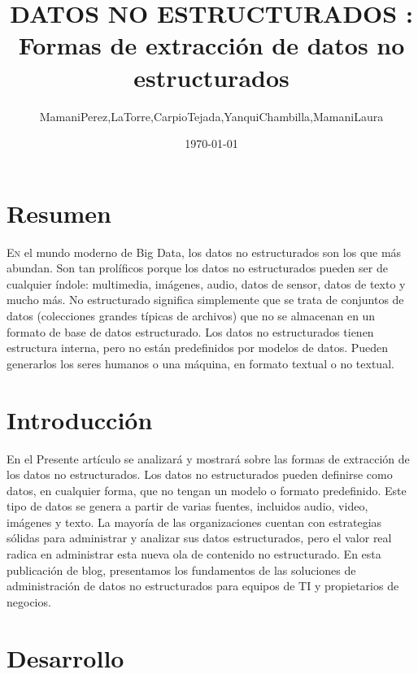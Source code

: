 \documentclass[twoside,twocolumn]{article}
\title{DATOS NO ESTRUCTURADOS : Formas de extracción de datos no estructurados} %
\author{MamaniPerez,LaTorre,CarpioTejada,YanquiChambilla,MamaniLaura}
\date{\today} %
\begin{document}
\maketitle


\section{Resumen}

\lettrine[nindent=0em,lines=2]{E}n el mundo moderno de Big Data, los datos no estructurados son los que más abundan. Son tan prolíficos porque los datos no estructurados pueden ser de cualquier índole: multimedia, imágenes, audio, datos de sensor, datos de texto y mucho más. No estructurado significa simplemente que se trata de conjuntos de datos (colecciones grandes típicas de archivos) que no se almacenan en un formato de base de datos estructurado. Los datos no estructurados tienen estructura interna, pero no están predefinidos por modelos de datos. Pueden generarlos los seres humanos o una máquina, en formato textual o no textual.


\section{Introducción}

 En el Presente artículo se analizará y mostrará sobre las formas de extracción de los datos no estructurados. Los datos no estructurados pueden definirse como datos, en cualquier forma, que no tengan un modelo o formato predefinido. Este tipo de datos se genera a partir de varias fuentes, incluidos audio, video, imágenes y texto.
La mayoría de las organizaciones cuentan con estrategias sólidas para administrar y analizar sus datos estructurados, pero el valor real radica en administrar esta nueva ola de contenido no estructurado. En esta publicación de blog, presentamos los fundamentos de las soluciones de administración de datos no estructurados para equipos de TI y propietarios de negocios.



\section{Desarrollo}
\end{document}
